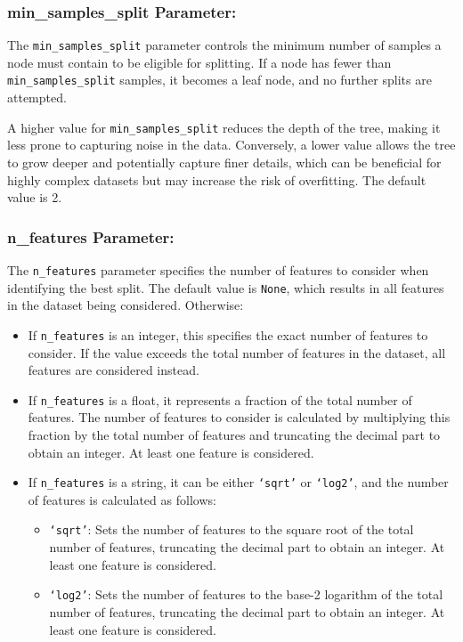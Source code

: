 \documentclass{article}
\begin{document}
\subsubsection*{min\_samples\_split Parameter:}

The \texttt{min\_samples\_split} parameter controls the minimum number of samples a node must contain to be eligible for splitting. If a node has fewer than \texttt{min\_samples\_split} samples, it becomes a leaf node, and no further splits are attempted.

A higher value for \texttt{min\_samples\_split} reduces the depth of the tree, making it less prone to capturing noise in the data. Conversely, a lower value allows the tree to grow deeper and potentially capture finer details, which can be beneficial for highly complex datasets but may increase the risk of overfitting. The default value is 2.

\subsubsection*{n\_features Parameter:}

The \texttt{n\_features} parameter specifies the number of features to consider when identifying the best split. The default value is \texttt{None}, which results in all features in the dataset being considered. Otherwise:

\begin{itemize}
    \item If \texttt{n\_features} is an integer, this specifies the exact number of features to consider. If the value exceeds the total number of features in the dataset, all features are considered instead.
    \item If \texttt{n\_features} is a float, it represents a fraction of the total number of features. The number of features to consider is calculated by multiplying this fraction by the total number of features and truncating the decimal part to obtain an integer. At least one feature is considered.
    \item If \texttt{n\_features} is a string, it can be either \texttt{`sqrt'} or \texttt{`log2'}, and the number of features is calculated as follows:
    \begin{itemize}
        \item \texttt{`sqrt'}: Sets the number of features to the square root of the total number of features, truncating the decimal part to obtain an integer. At least one feature is considered.
        \item \texttt{`log2'}: Sets the number of features to the base-2 logarithm of the total number of features, truncating the decimal part to obtain an integer. At least one feature is considered.
    \end{itemize}
\end{itemize}
\end{document}
